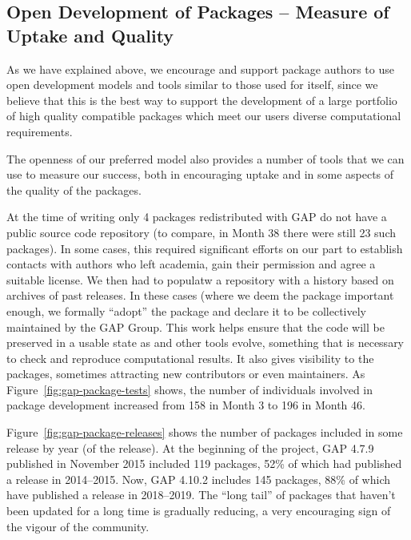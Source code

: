 \subsection{Open Development of \GAP Packages -- Measure of Uptake
  and Quality}

As we have explained above, we encourage and support package authors
to use open development models and tools similar to those used for
\GAP itself, since we believe that this is the best way to support the
development of a large portfolio of high quality compatible packages
which meet our users diverse computational requirements.

The openness of our preferred model also provides a number of tools
that we can use to measure our success, both in encouraging uptake and
in some aspects of the quality of the packages.

At the time of writing only 4 packages redistributed with GAP do not
have a public source code repository (to compare, in Month 38 there
were still 23 such packages). In some cases, this required significant
efforts on our part to establish contacts with authors who left
academia, gain their permission and agree a suitable license. We then
had to  populatw a repository with a history based on archives of
past releases. In these cases (where we deem the package important
enough,  we formally ``adopt'' the package and declare it to be collectively maintained
by the GAP Group. This work helps ensure that the code will be
preserved in a usable state as \GAP and other tools evolve, something
that is
necessary to check and reproduce computational results. It also gives
visibility to the packages, sometimes attracting new contributors or
even maintainers. As
Figure~\ref{fig:gap-package-tests} shows, the number of individuals
involved in package development increased from 158 in Month 3 to 196
in Month 46.

Figure~\ref{fig:gap-package-releases} shows the number of \GAP packages
included in some \GAP release by year (of the release).
At the beginning of the project, GAP 4.7.9 published in November
2015 included 119 packages, 52\% of which had published a release in 2014--2015.
Now, GAP 4.10.2 includes 145 packages, 88\% of which have published a
release in 2018--2019. The ``long tail'' of packages that haven't been updated for
a long time is gradually reducing, a very encouraging sign of the
vigour of the community.

